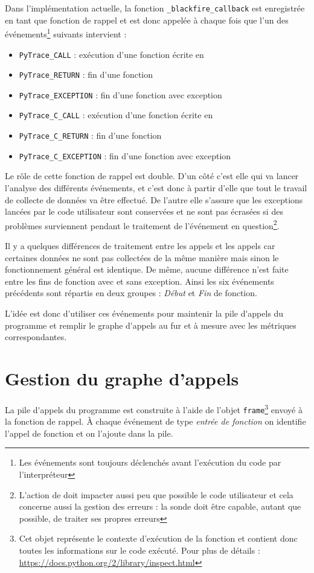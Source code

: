 Dans l'implémentation actuelle, la fonction \C \verb|_blackfire_callback| est enregistrée en tant que fonction de rappel et est donc appelée à chaque fois que l'un des événements\footnote{Les événements sont toujours déclenchés avant l'exécution du code par l'interpréteur} suivants intervient :
\begin{itemize}
\item \verb|PyTrace_CALL| : exécution d'une fonction écrite en \Python
\item \verb|PyTrace_RETURN| : fin d'une fonction \Python
\item \verb|PyTrace_EXCEPTION| : fin d'une fonction \Python avec exception
\item \verb|PyTrace_C_CALL| : exécution d'une fonction écrite en \C
\item \verb|PyTrace_C_RETURN| : fin d'une fonction \C
\item \verb|PyTrace_C_EXCEPTION| : fin d'une fonction \C avec exception
\end{itemize}

Le rôle de cette fonction de rappel est double. D'un côté c'est elle qui va lancer l'analyse des différents événements, et c'est donc à partir d'elle que tout le travail de collecte de données va être effectué. De l'autre elle s'assure que les exceptions lancées par le code utilisateur sont conservées et ne sont pas écrasées si des problèmes surviennent pendant le traitement de l'événement en question\footnote{L'action de \Blackfire doit impacter aussi peu que possible le code utilisateur et cela concerne aussi la gestion des erreurs : la sonde doit être capable, autant que possible, de traiter ses propres erreurs}.

Il y a quelques différences de traitement entre les appels \C et les appels \Python car certaines données ne sont pas collectées de la même manière mais sinon le fonctionnement général est identique. De même, aucune différence n'est faite entre les fins de fonction avec et sans exception. Ainsi les six événements précédents sont répartis en deux groupes : \emph{Début} et \emph{Fin} de fonction.

L'idée est donc d'utiliser ces événements pour maintenir la \gls{pile d'appels} du programme et remplir le \gls{graphe d'appels} au fur et à mesure avec les métriques correspondantes.

  \section{Gestion du graphe d'appels}
  \label{sec:gestion-graph-appels}
La \gls{pile d'appels} du programme est construite à l'aide de l'objet \verb|frame|\footnote{Cet objet représente le contexte d'exécution de la fonction et contient donc toutes les informations sur le code exécuté. Pour plus de détails : \url{https://docs.python.org/2/library/inspect.html}} envoyé à la fonction de rappel. À chaque événement de type \emph{entrée de fonction} on identifie l'appel de fonction et on l'ajoute dans la pile.
  

